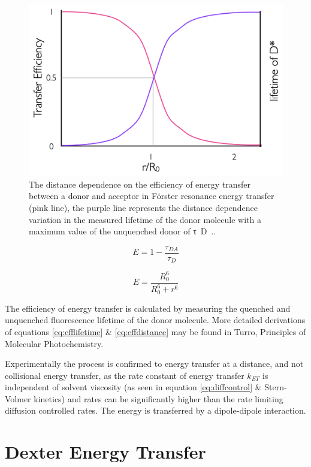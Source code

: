 \documentclass[
]{book}
\begin{document}
\begin{figure}

{\centering \includegraphics[width=0.7\linewidth]{images/forsterdistance} 

}

\caption{The distance dependence on the efficiency of energy transfer between a donor and acceptor in Förster resonance energy transfer (pink line), the purple line represents the distance dependence variation in the measured lifetime of the donor molecule with a maximum value of the unquenched donor of τ~D~..}\label{fig:forsterdistance}
\end{figure}

\begin{equation}
E=1-\frac{\tau_{DA}}{\tau_D}
\label{eq:efflifetime}
\end{equation}

\begin{equation}
E = \frac{R_0^6}{R_0^6+ r^6}
\label{eq:effdistance}
\end{equation}

The efficiency of energy transfer is calculated by measuring the quenched and unquenched fluorescence lifetime of the donor molecule. More detailed derivations of equations \eqref{eq:efflifetime} \& \eqref{eq:effdistance} may be found in Turro, Principles of Molecular Photochemistry.

Experimentally the process is confirmed to energy transfer at a distance, and not collisional energy transfer, as the rate constant of energy transfer \(k_{ET}\) is independent of solvent viscosity (as seen in equation \eqref{eq:diffcontrol} \& Stern-Volmer kinetics) and rates can be significantly higher than the rate limiting diffusion controlled rates. The energy is transferred by a dipole-dipole interaction.

\hypertarget{sec:Dexter}{%
\section{Dexter Energy Transfer}\label{sec:Dexter}}
\end{document}
